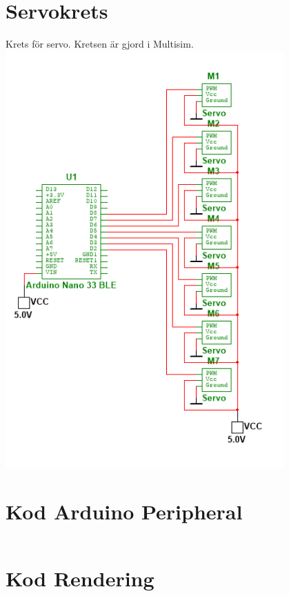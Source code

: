 \documentclass[a4paper]{article}
\begin{document}
\begin{sloppypar}
    \section{Servokrets}
    \label{bilaga:Kretsschema-servo}
    Krets för servo. Kretsen är gjord i Multisim.
    \includegraphics[width = 0.8\textwidth]{servo.png}

    \newpage
    \section{Kod Arduino Peripheral}
    \label{bilaga:Kod_Arduino_Peripheral}
    \inputminted[breaklines]{cpp}{./Code/peripheral.cpp}

    \newpage
    \section{Kod Rendering}
    \label{bilaga:Kod_Rendering}
    \inputminted[breaklines]{csharp}{./Code/handController.cs}
    \newpage
\end{sloppypar}
\end{document}
